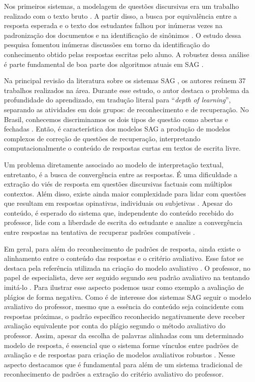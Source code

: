 Nos primeiros sistemas, a modelagem de questões discursivas era um trabalho realizado com o texto bruto \cite{perez-marin2009}. A partir disso, a busca por equivalência entre a resposta esperada e o texto dos estudantes falhou por inúmeras vezes na padronização dos documentos e na identificação de sinônimos \cite{leffa2003}. O estudo dessa pesquisa fomentou inúmeras discussões em torno da identificação do conhecimento obtido pelas respostas escritas pelo aluno. A robustez dessa análise é parte fundamental de boa parte dos algoritmos atuais em SAG \cite{filighera2020}.

Na principal revisão da literatura sobre os sistemas SAG \cite{burrows2015}, os autores reúnem 37 trabalhos realizados na área. Durante esse estudo, o autor destaca o problema da  profundidade do aprendizado, em tradução literal para ``\textit{depth of learning}'', separando as atividades em dois grupos: de reconhecimento e de recuperação. No Brasil, conhecemos discriminamos os dois tipos de questão como abertas e fechadas \cite{gunther2012}. Então, é característica dos modelos SAG a produção de modelos complexos de correção de questões de recuperação, interpretando computacionalmente o conteúdo de respostas curtas em textos de escrita livre.

Um problema diretamente associado ao modelo de interpretação textual, entretanto, é a busca de convergência entre as respostas. É uma dificuldade a extração do viés de resposta em questões discursivas factuais com múltiplos contextos. Além disso, existe ainda maior complexidade para lidar com questões que resultam em respostas opinativas, individuais ou subjetivas \cite{bailey2008}. Apesar do conteúdo, é esperado do sistema que, independente do conteúdo recebido do professor, lide com a liberdade de escrita do estudante e analize a convergência entre respostas na tentativa de recuperar padrões compatíveis \cite{saha2018}. 

Em geral, para além do reconhecimento de padrões de resposta, ainda existe o alinhamento entre o conteúdo das respostas e o critério avaliativo. Esse fator se destaca pela referência utilizada na criação do modelo avaliativo \cite{krithika2015}. O professor, no papel de especialista, deve ser seguido segundo seu padrão avaliativo na tentando imitá-lo \cite{jordan2012, funayama2020}. Para ilustrar esse aspecto podemos usar como exemplo a avaliação de plágios de forma negativa. Como é de interesse dos sistemas SAG seguir o modelo avaliativo do professor, mesmo que a essência do conteúdo seja coincidente com respostas próximas, o padrão específico reconhecido negativamente deve receber avaliação equivalente por conta do plágio segundo o método avaliativo do professor. Assim, apesar da escolha de palavras alinhadas com um determinado modelo de resposta, é essencial que o sistema forme vínculos entre padrões de avaliação e de respostas para criação de modelos avaliativos robustos \cite{higgins2014}. Nesse aspecto destacamos que é fundamental para além de um sistema tradicional de reconhecimento de padrões a extração do critério avaliativo do professor.

